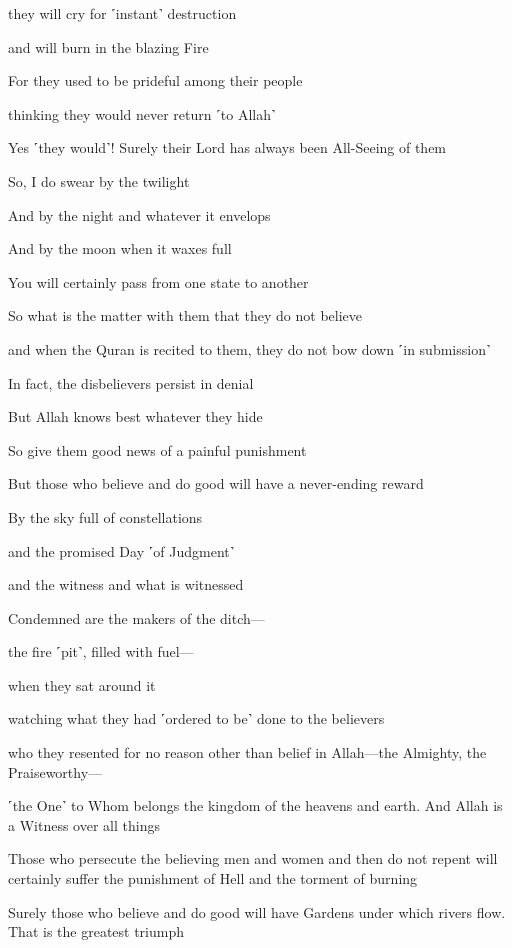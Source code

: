 they will cry for ˹instant˺ destruction

and will burn in the blazing Fire

For they used to be prideful among their people

thinking they would never return ˹to Allah˺

Yes ˹they would˺! Surely their Lord has always been All-Seeing of them

So, I do swear by the twilight

And by the night and whatever it envelops

And by the moon when it waxes full

You will certainly pass from one state to another

So what is the matter with them that they do not believe

and when the Quran is recited to them, they do not bow down ˹in submission˺

In fact, the disbelievers persist in denial

But Allah knows best whatever they hide

So give them good news of a painful punishment

But those who believe and do good will have a never-ending reward

By the sky full of constellations

and the promised Day ˹of Judgment˺

and the witness and what is witnessed

Condemned are the makers of the ditch—

the fire ˹pit˺, filled with fuel—

when they sat around it

watching what they had ˹ordered to be˺ done to the believers

who they resented for no reason other than belief in Allah—the Almighty, the Praiseworthy—

˹the One˺ to Whom belongs the kingdom of the heavens and earth. And Allah is a Witness over all things

Those who persecute the believing men and women and then do not repent will certainly suffer the punishment of Hell and the torment of burning

Surely those who believe and do good will have Gardens under which rivers flow. That is the greatest triumph

